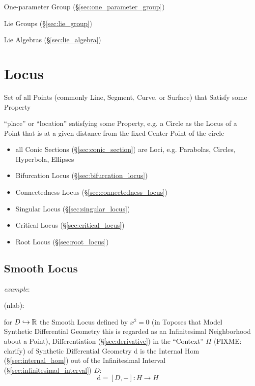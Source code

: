 One-parameter Group (\S\ref{sec:one_parameter_group})

Lie Groups (\S\ref{sec:lie_group})

Lie Algebras (\S\ref{sec:lie_algebra})



\section{Locus}\label{sec:locus}


Set of all Points (commonly Line, Segment, Curve, or Surface) that Satisfy some
Property

``place'' or ``location'' satisfying some Property, e.g. a Circle as the Locus
of a Point that is at a given distance from the fixed Center Point of the circle

\begin{itemize}
  \item all Conic Sections (\S\ref{sec:conic_section}) are Loci, e.g. Parabolas,
    Circles, Hyperbola, Ellipses
  \item Bifurcation Locus (\S\ref{sec:bifurcation_locus})
  \item Connectedness Locus (\S\ref{sec:connectedness_locus})
  \item Singular Locus (\S\ref{sec:singular_locus})
  \item Critical Locus (\S\ref{sec:critical_locus})
  \item Root Locus (\S\ref{sec:root_locus})
\end{itemize}




\subsection{Smooth Locus}\label{sec:smooth_locus}


\emph{example}:

(nlab):

for $D \hookrightarrow \mathbb{R}$ the Smooth Locus defined by $x^2 = 0$ (in Toposes
that Model Synthetic Differential Geometry this is regarded as an Infinitesimal
Neighborhood about a Point), Differentiation (\S\ref{sec:derivative}) in the
``Context'' $H$ (FIXME: clarify) of Synthetic Differential Geometry $\mathrm{d}$
is the Internal Hom (\S\ref{sec:internal_hom}) out of the Infinitesimal Interval
(\S\ref{sec:infinitesimal_interval}) $D$:
\[
  \mathrm{d} = [D,-] : H \rightarrow H
\]



